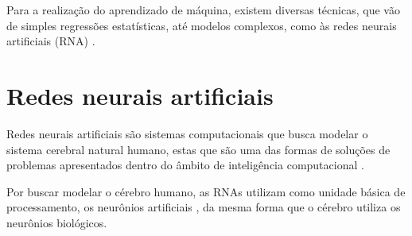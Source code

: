 \par Para a realização do aprendizado de máquina, existem diversas técnicas, que vão de simples regressões estatísticas, até modelos complexos, como às redes neurais artificiais (RNA) \cite{andrewngcourse}.

\section{Redes neurais artificiais}

\par Redes neurais artificiais são sistemas computacionais que busca modelar o sistema cerebral natural humano, estas que são uma das formas de soluções de problemas apresentados dentro do âmbito de inteligência computacional \cite{Cintra2019}.

\par Por buscar modelar o cérebro humano, as RNAs utilizam como unidade básica de processamento, os neurônios artificiais \cite{Haykin2001}, da mesma forma que o cérebro utiliza os neurônios biológicos. %



